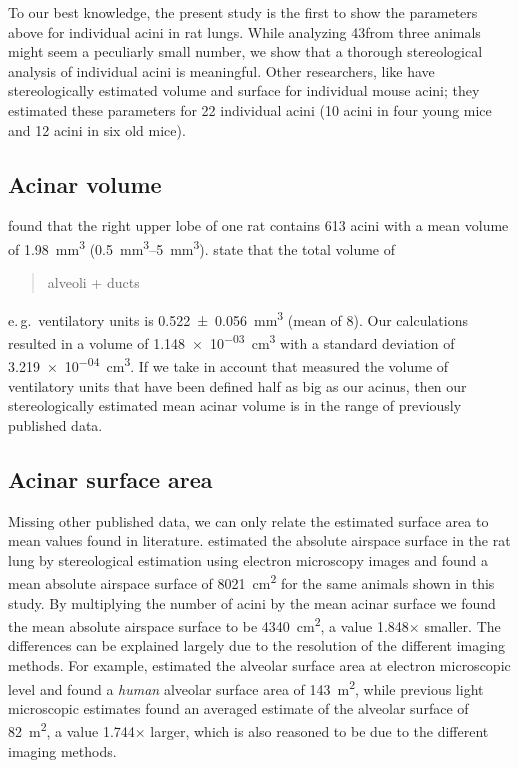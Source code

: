 \documentclass[a4paper,DIV=calc,abstract,english]{scrartcl}
\newcommand{\eg}{e.\,g.\ }
\newcommand{\numberofacini}{43}
\newcommand{\meanacinarvolume}{1.148e-03} %
\newcommand{\std}{3.219e-04} %
\newcommand{\meanairspacesurface}{4340} %
\newcommand{\airspacedifference}{1.848} %
\begin{document}
To our best knowledge, the present study is the first to show the parameters above for individual acini in rat lungs.
While analyzing \numberofacini from three animals might seem a peculiarly small number, we show that a thorough stereological analysis of individual acini is meaningful.
Other researchers, like \citet{Vasilescu2012} have stereologically estimated volume and surface for individual mouse acini; they estimated these parameters for 22 individual acini (10 acini in four young mice and 12 acini in six old mice).

\subsection{Acinar volume}
\citet{Rodriguez1987} found that the right upper lobe of one rat contains 613 acini with a mean volume of \SI{1.98}{\milli\meter\cubed} (\SIrange{0.5}{5}{\milli\meter\cubed}).
\citet{Mercer1987a} state that the total volume of \blockquote{alveoli + ducts} \eg ventilatory units is \SI{0.522(56)}{\cubic\milli\meter} (mean of 8). %
Our calculations resulted in a volume of \SI{\meanacinarvolume}{\cubic\centi\meter} with a standard deviation of \SI{\std}{\cubic\centi\meter}.
If we take in account that \cite{Mercer1987a} measured the volume of ventilatory units that have been defined half as big as our acinus, then our stereologically estimated mean acinar volume is in the range of previously published data.

\subsection{Acinar surface area}
Missing other published data, we can only relate the estimated surface area to mean values found in literature.
\citet{Tschanz2003} estimated the absolute airspace surface in the rat lung by stereological estimation using electron microscopy images and found a mean absolute airspace surface of \SI{8021}{\centi\metre\squared} for the same animals shown in this study.
By multiplying the number of acini by the mean acinar surface we found the mean absolute airspace surface to be \SI{\meanairspacesurface}{\centi\metre\squared}, a value \airspacedifference\(\times\) smaller.
The differences can be explained largely due to the resolution of the different imaging methods.
For example, \citet{Gehr1978} estimated the alveolar surface area at electron microscopic level and found a \emph{human} alveolar surface area of \SI{143}{\square\meter}, while previous light microscopic estimates \cite{Weibel1963,Thurlbeck1967} found an averaged estimate of the alveolar surface of \SI{82}{\square\meter}, a value 1.744\(\times\) larger, which is also reasoned to be due to the different imaging methods.
\end{document}
